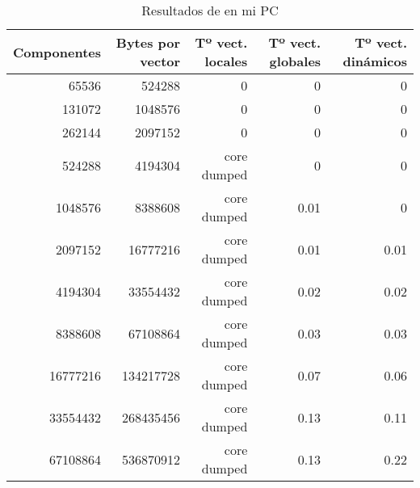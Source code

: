 \begin{center}
\begin{table}[!h]
\begin{tabular}{r r r r r}
\textbf{Componentes} & \textbf{Bytes por vector} & \textbf{Tº vect. locales} & \textbf{Tº vect. globales} & \textbf{Tº vect. dinámicos} \\
\toprule
65536                   & 524288                      & 0                         & 0                          & 0                           \\
131072                  & 1048576                     & 0                         & 0                          & 0                           \\
262144                  & 2097152                     & 0                         & 0                          & 0                           \\
524288                  & 4194304                     & core dumped               & 0                          & 0                           \\
1048576                 & 8388608                     & core dumped               & 0.01                       & 0                           \\
2097152                 & 16777216                    & core dumped               & 0.01                       & 0.01                        \\
4194304                 & 33554432                    & core dumped               & 0.02                       & 0.02                        \\
8388608                 & 67108864                    & core dumped               & 0.03                       & 0.03                        \\
16777216                & 134217728                   & core dumped               & 0.07                       & 0.06                        \\
33554432                & 268435456                   & core dumped               & 0.13                       & 0.11                        \\
67108864                & 536870912                   & core dumped               & 0.13                       & 0.22                        \\
\end{tabular}
\caption{Resultados de  en mi PC}
\end{table}


\end{center}
